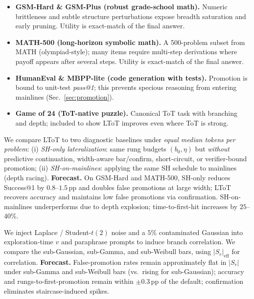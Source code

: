 \documentclass{article}
\begin{document}
\begin{itemize}[leftmargin=*, itemsep=2pt, topsep=2pt]
    \item \textbf{GSM-Hard \& GSM-Plus (robust grade-school math).}
    Numeric brittleness and subtle structure perturbations expose breadth saturation and early pruning.
    Utility is exact-match of the final answer.
    \item \textbf{MATH-500 (long-horizon symbolic math).}
    A 500-problem subset from MATH (olympiad-style); many items require multi-step derivations where payoff appears after several steps.
    Utility is exact-match of the final answer.
    \item \textbf{HumanEval \& MBPP-lite (code generation with tests).}
    Promotion is bound to unit-test \emph{pass@1}; this prevents specious reasoning from entering mainlines (Sec.~\ref{sec:promotion}).
    \item \textbf{Game of 24 (ToT-native puzzle).}
    Canonical ToT task with branching and depth; included to show LToT improves even where ToT is strong.
\end{itemize}

We compare LToT to two diagnostic baselines under \emph{equal median tokens per problem}:
(i) \emph{SH-only lateralization}: same rung budgets $(b_0,\eta)$ but \emph{without} predictive continuation, width-aware bar/confirm, short-circuit, or verifier-bound promotion;
(ii) \emph{SH-on-mainlines}: applying the same SH schedule to mainlines (depth racing).
\textbf{Forecast.} On GSM-Hard and MATH-500, SH-only reduces Success@1 by $0.8$--$1.5$\,pp and doubles false promotions at large width;
LToT recovers accuracy and maintains low false promotions via confirmation. SH-on-mainlines underperforms due to depth explosion;
time-to-first-hit increases by $25$--$40$\%.

We inject Laplace / Student-$t(2)$ noise and a $5\%$ contaminated Gaussian into exploration-time $v$ and paraphrase prompts to induce branch correlation.
We compare the sub-Gaussian, sub-Gamma, and sub-Weibull bars, using $|S_r|_{\mathrm{eff}}$ for correlation.
\textbf{Forecast.} False-promotion rates remain approximately flat in $|S_r|$ under sub-Gamma and sub-Weibull bars (vs.\ rising for sub-Gaussian);
accuracy and rungs-to-first-promotion remain within $\pm 0.3$\,pp of the default; confirmation eliminates staircase-induced spikes.
\end{document}
